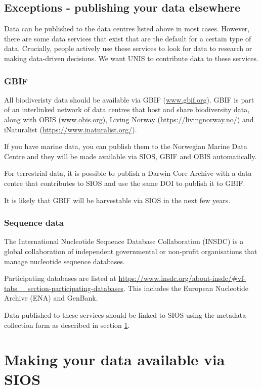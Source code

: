 \documentclass[a4paper,12pt]{article}
\begin{document}
\subsection{Exceptions - publishing your data elsewhere}

Data can be published to the data centres listed above in most cases. However, there are some data services that exist that are the default for a certain type of data. Crucially, people actively use these services to look for data to research or making data-driven decisions. We want UNIS to contribute data to these services. 

\subsubsection{GBIF}

All biodiveristy data should be available via GBIF (\url{www.gbif.org}). GBIF is part of an interlinked network of data centres that host and share biodiversity data, along with OBIS (\url{www.obis.org}), Living Norway (\url{https://livingnorway.no/}) and iNaturalist (\url{https://www.inaturalist.org/}). 

If you have marine data, you can publish them to the Norwegian Marine Data Centre and they will be made available via SIOS, GBIF and OBIS automatically.

For terrestrial data, it is possible to publish a Darwin Core Archive with a data centre that contributes to SIOS and use the same DOI to publish it to GBIF. 

It is likely that GBIF will be harvestable via SIOS in the next few years.

\subsubsection{Sequence data}

The International Nucleotide Sequence Database Collaboration (INSDC) is a global collaboration of independent governmental or non-profit organisations that manage nucleotide sequence databases.

Participating databases are listed at \url{
https://www.insdc.org/about-insdc/#vf-tabs__section-participating-databases}. This includes the European Nucleotide Archive (ENA) and GenBank.

Data published to these services should be linked to SIOS using the metadata collection form as described in section \ref{sec: linking data to sios}.

\section{Making your data available via SIOS}
\label{sec: linking data to sios}
\end{document}
